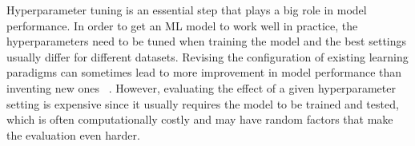 \documentclass[preprint]{vgtc}        %
\begin{document}


Hyperparameter tuning is an essential step that plays a big role in model performance. In order to get an ML model to work well in practice, the hyperparameters need to be tuned when training the model and the best settings usually differ for different datasets. Revising the configuration of existing learning paradigms can sometimes lead to more improvement in model performance than inventing new ones ~\cite{Pinto2009ARepresentation,CoatesAnLearning}. 
However, evaluating the effect of a given hyperparameter setting is expensive since it usually requires the model to be trained and tested, which is often computationally costly and may have random factors that make the evaluation even harder. 
\end{document}
